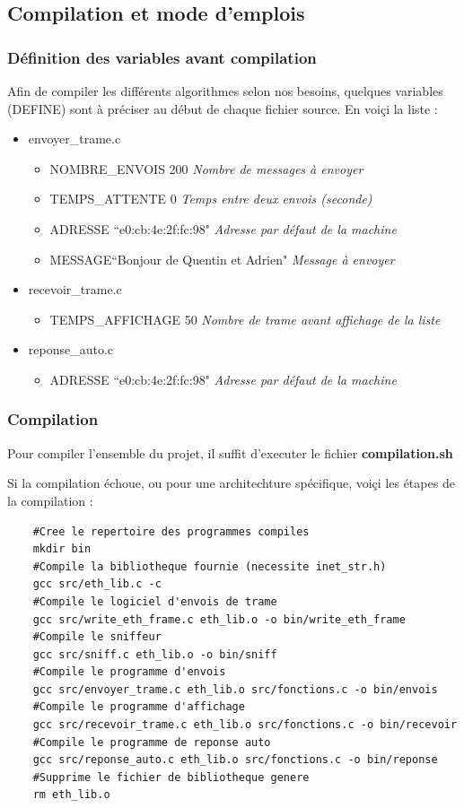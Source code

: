 \documentclass[a4paper,11pt]{article}
\begin{document}
	\subsection{Compilation et mode d'emplois}
		\subsubsection{Définition des variables avant compilation}
		Afin de compiler les différents algorithmes selon nos besoins, quelques variables (DEFINE) sont à préciser au début de chaque fichier source. En voiçi la liste :
		\begin{itemize}
		\item envoyer\_trame.c
			\begin{itemize}
			\item NOMBRE\_ENVOIS 200 \textit{Nombre de messages à envoyer}
			\item TEMPS\_ATTENTE 0    \textit{Temps entre deux envois (seconde)}
			\item ADRESSE ``e0:cb:4e:2f:fc:98" \textit{Adresse par défaut de la machine}
			\item MESSAGE``Bonjour de Quentin et Adrien" \textit{Message à envoyer}
			\end{itemize}
		\item recevoir\_trame.c
			\begin{itemize}
			\item TEMPS\_AFFICHAGE 50 \textit{Nombre de trame avant affichage de la liste}
			\end{itemize}
		\item reponse\_auto.c
			\begin{itemize}
			\item ADRESSE ``e0:cb:4e:2f:fc:98" \textit{Adresse par défaut de la machine}
			\end{itemize}
		\end{itemize}
		\subsubsection{Compilation}
		Pour compiler l'ensemble du projet, il suffit d'executer le fichier \textbf{compilation.sh}
		
		Si la compilation échoue, ou pour une architechture spécifique, voiçi les étapes de la compilation :
		\lstset{language=bash}
		\begin{lstlisting}
	#Cree le repertoire des programmes compiles
	mkdir bin
	#Compile la bibliotheque fournie (necessite inet_str.h)
	gcc src/eth_lib.c -c
	#Compile le logiciel d'envois de trame
	gcc src/write_eth_frame.c eth_lib.o -o bin/write_eth_frame
	#Compile le sniffeur
	gcc src/sniff.c eth_lib.o -o bin/sniff
	#Compile le programme d'envois
	gcc src/envoyer_trame.c eth_lib.o src/fonctions.c -o bin/envois
	#Compile le programme d'affichage
	gcc src/recevoir_trame.c eth_lib.o src/fonctions.c -o bin/recevoir
	#Compile le programme de reponse auto
	gcc src/reponse_auto.c eth_lib.o src/fonctions.c -o bin/reponse
	#Supprime le fichier de bibliotheque genere
	rm eth_lib.o
		\end{lstlisting}
\end{document}

